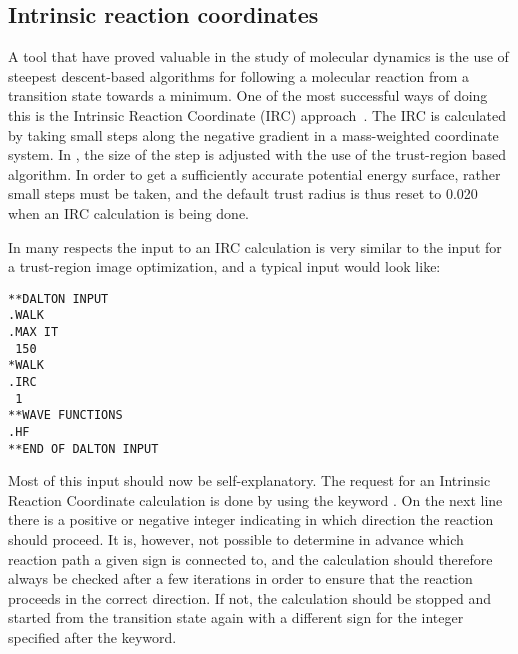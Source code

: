 \subsection{Intrinsic reaction coordinates}\label{sec:irc}

\begin{center}
\end{center}

A tool that have proved valuable in the study of molecular
dynamics
is the use of steepest descent-based algorithms
for following a molecular reaction from a transition
state towards a minimum. One of the
most successful ways of doing this is the Intrinsic Reaction Coordinate (IRC)
approach~\cite{kfacr14}. The IRC is calculated by taking small steps along the
negative gradient in a mass-weighted 
coordinate system. In {\dalton}, the
size of the step is adjusted with the use of the trust-region based
algorithm. In order to get a sufficiently accurate potential energy surface,
rather small steps must be taken, and the default trust radius is thus reset
to 0.020 when an IRC calculation is being done.

In many respects the input to an IRC calculation is very similar to
the input for a trust-region image optimization,
and a typical input would look like:

\begin{verbatim}
**DALTON INPUT
.WALK
.MAX IT
 150
*WALK
.IRC
 1
**WAVE FUNCTIONS
.HF
**END OF DALTON INPUT
\end{verbatim}

Most of this input should now be self-explanatory. The request for an
Intrinsic Reaction Coordinate calculation is done by using the keyword
. On the next line there is a positive or negative integer
indicating in which direction the reaction should proceed. It is,
however, not possible to determine in advance which reaction path a
given sign is connected to, and the calculation should therefore
always be checked after a few iterations in order to ensure that the
reaction proceeds in the correct direction. If not, the calculation
should be stopped and started from the transition state again with a
different sign for the integer specified after the  keyword.


